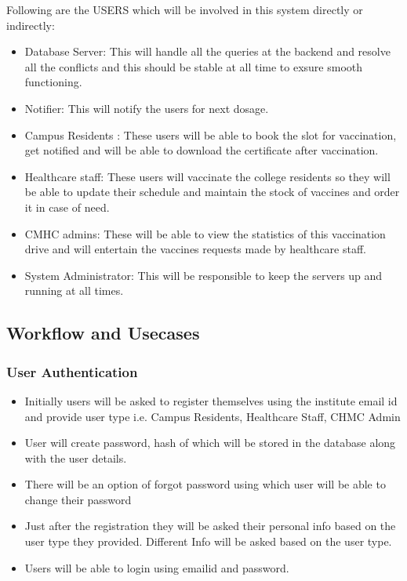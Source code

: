 \documentclass[10pt,twocolumn,letterpaper]{article}
\begin{document}
Following are the USERS which will be involved in this system directly or indirectly:
\begin{itemize}
    \item Database Server: This will handle all the queries at the backend and resolve all the conflicts and this should be stable at all time to exsure smooth functioning.
    \item Notifier: This will notify the users for next dosage.
    \item Campus Residents : These users will be able to book the slot for vaccination, get notified and will be able to download the certificate after vaccination.
    \item Healthcare staff: These users will vaccinate the college residents so they will be able to update their schedule and maintain the stock of vaccines and order it in case of need.
    \item CMHC admins: These will be able to view the statistics of this vaccination drive and will entertain the vaccines requests made by healthcare staff. 
    \item System Administrator: This will be responsible to keep the servers up and running at all times.
\end{itemize}
\subsection{Workflow and Usecases}
\subsubsection{User Authentication}
\begin{itemize}
    \item Initially users will be asked to register themselves using the institute email id and provide user type i.e. Campus Residents, Healthcare Staff, CHMC Admin
    \item User will create password, hash of  which will be stored in the database along with the user details.
    \item There will be an option of forgot password using which user will be able to change their password
    \item Just after the registration they will be asked their personal info based on the user type they provided. Different Info will be asked based on the user type.
    \item Users will be able to login using emailid and password.
\end{itemize} 
\end{document}
